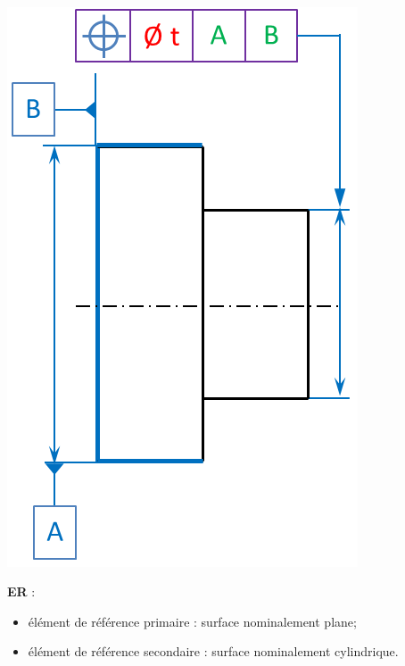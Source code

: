 \documentclass[11pt,oneside]{article}
\begin{document}
\begin{exemple}
\begin{minipage}[t]{.3\linewidth}
\begin{center}
$\;$

\includegraphics[width=.95\textwidth]{png/rs_syst2}
\end{center}
\end{minipage} \hfill
\begin{minipage}[t]{.3\linewidth}
\textbf{ER} : 
\begin{itemize}
\item élément de référence primaire : surface nominalement plane;
\item élément de référence secondaire : surface nominalement cylindrique.
\end{itemize}

\end{minipage}
\end{exemple}
\end{document}
